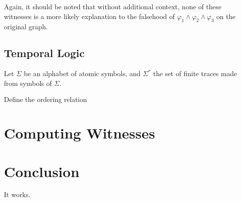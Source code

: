 Again, it should be noted that without additional context, none of these witnesses is a more likely explanation to the falsehood of $\varphi_1 \wedge \varphi_2 \wedge \varphi_3$ on the original graph.


\subsection{Temporal Logic}

Let $\Sigma$ be an alphabet of atomic symbols, and $\Sigma^*$ the set of finite traces made from symbols of $\Sigma$.

Define the ordering relation 



\section{Computing Witnesses} %




\section{Conclusion} %

It works.



%
%
%
%
%
%

%



